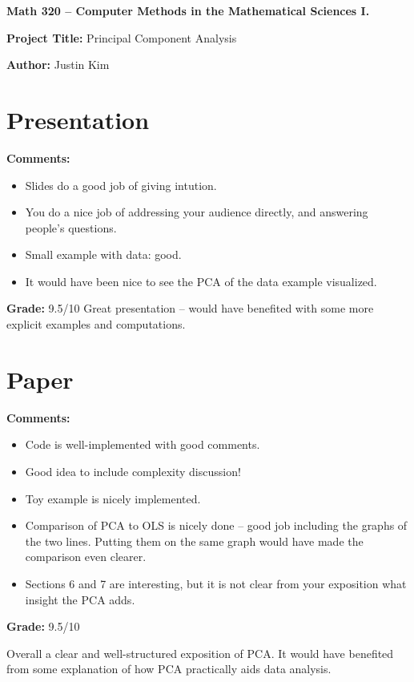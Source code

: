 \documentclass[12pt]{article}
\begin{document}
{\bf \large Math 320 -- Computer Methods in the Mathematical Sciences I.}\\

\vspace{3mm}

{\bf \large Project Title:} Principal Component Analysis\\
\vspace{2mm}

{\bf \large Author:} Justin Kim\\

\vspace{3mm}

\section{Presentation}
{\bf \large Comments:}
\begin{itemize}
\item Slides do a good job of giving intution.
\item You do a nice job of addressing your audience directly,
and answering people's questions.
\item Small example with data: good.
\item It would have been nice to see the PCA of the data example
visualized.
\end{itemize}

{\bf \large Grade:} 9.5/10
Great presentation -- would have benefited with some more
explicit examples and computations.


\section{Paper}

{\bf \large Comments:}
\begin{itemize}
\item Code is well-implemented with good comments.
\item Good idea to include complexity discussion!
\item Toy example is nicely implemented.
\item Comparison of PCA to OLS is nicely done -- good job including
the graphs of the two lines. Putting them on the same graph would
have made the comparison even clearer.
\item Sections 6 and 7 are interesting, but it is not clear from your 
exposition what insight the PCA adds.
\end{itemize}


{\bf \large Grade:} 9.5/10

Overall a clear and well-structured exposition of PCA. It would
have benefited from some explanation of how PCA practically aids data
analysis.
\end{document}
